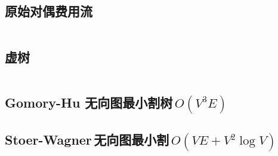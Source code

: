 \documentclass[titlepage, a4paper]{article}
\begin{document}
\begin{multicols}{2}
\begin{spacing}{0.6}
				\subsection{原始对偶费用流}
					\inputminted[highlightlines={2,3,22,25,28,31,42,43}]{cpp}{src/TreeandGraph/多路增广费用流.cpp}
				\subsection{虚树}
				\inputminted{cpp}{src/TreeandGraph/虚树.cpp}
				
				\subsection{Gomory-Hu 无向图最小割树\,$O(V ^ 3 E)$}
					
				\subsection{Stoer-Wagner\,无向图最小割\,$O(VE + V ^ 2 \log V)$}
					\inputminted{cpp}{src/yzh/Stoer-Wagner.cpp}

\end{spacing}
\end{multicols}
\end{document}
